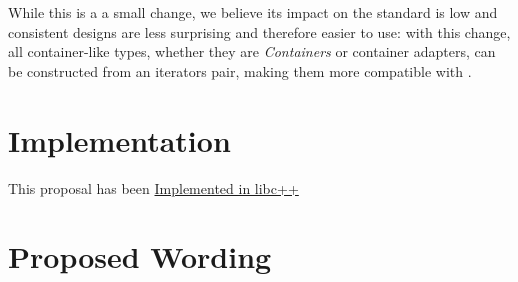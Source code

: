\documentclass{wg21}
\begin{document}
While this is a a small change, we believe its impact on the standard is low and consistent designs are less surprising and therefore easier
to use: with this change, all container-like types, whether they are \emph{Containers} or container adapters, can be constructed from 
an iterators pair, making them more compatible with .

\pagebreak

\section{Implementation}

This proposal has been \href{https://github.com/cor3ntin/llvm-project/tree/stack_queue_iterators}{Implemented in libc++}

\section{Proposed Wording}
\end{document}
